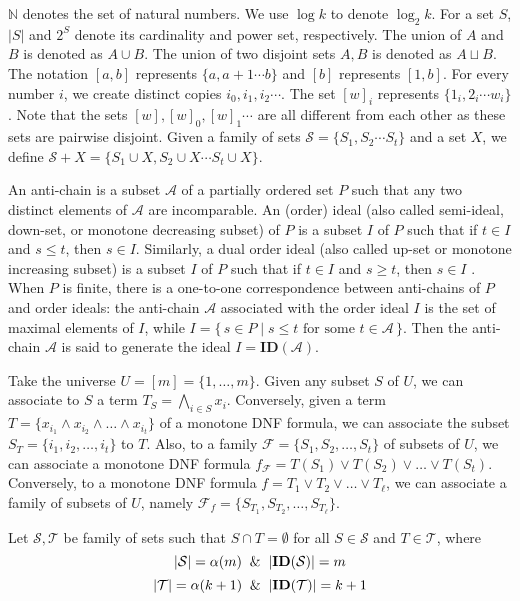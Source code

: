 
$\mathbb{N}$ denotes the set of natural numbers. We use
$\log{k}$ to denote $\log_{2}{k}$. For a set $S$, $|{S}|$
and $2^{{S}}$ denote its cardinality and power set,
respectively. The union of $A$ and $B$ is denoted as $A\cup B$. The union of two disjoint sets $A,B$ is denoted as $A \sqcup B$. The notation $[a,b]$ represents
$\{a,a+1\cdots b\}$ and $[b]$ represents $[1,b]$.
For every number $i$, we create distinct copies
$i_0,i_1,i_2\cdots$. The set $[w]_i$ represents
$\{1_i,2_i\cdots w_i\}$. Note that the sets
$[w],[w]_0,[w]_1\cdots$ are all different from each
other as these sets are pairwise disjoint. Given a family of
sets $\mathcal{S}=\{S_1,S_2\cdots S_t\}$ and a set $X$, we
define $\mathcal{S}+X= \{S_1\cup X,S_2\cup X\cdots S_t\cup X\}$.

An anti-chain is a subset $\mathcal{A}$ of a partially
ordered set $P$ such that any two distinct elements of
$\mathcal{A}$ are incomparable. An (order) ideal (also
called semi-ideal, down-set, or monotone decreasing subset)
of $P$ is a subset $I$ of $P$ such that if $t \in I$ and
$s \leq t$, then $s \in I$. Similarly, a dual order ideal
(also called up-set or monotone increasing subset) is a
subset $I$ of $P$ such that if $t \in I$ and $s \geq t$,
then $s \in I$ \cite{stanley}. When $P$ is finite, there is
a one-to-one correspondence between anti-chains of $P$ and
order ideals: the anti-chain $\mathcal{A}$ associated with
the order ideal $I$ is the set of maximal elements of $I$,
while $I = \{\, s \in P \mid s \leq t \text{ for some }
t \in \mathcal{A} \,\}$. Then the anti-chain $\mathcal{A}$
is said to generate the ideal $I=\mathbf{ID}(\mathcal{A})$.


Take the universe $U = [m] = \{1,\ldots,m\}$. Given any subset
$S$ of $U$, we can associate to $S$ a term
$T_S= \bigwedge_{i \in S} x_i$. Conversely, given a term
$T= \{ x_{i_1} \land x_{i_2} \land \ldots \land x_{i_t} \}$
of a monotone DNF formula, we can associate the subset
$S_T = \{i_1, i_2, \ldots, i_t\}$ to $T$. Also, to a family
$\mathcal{F} = \{ S_1, S_2, \ldots, S_t\}$ of subsets of $U$,
we can associate a monotone DNF formula
$f_{\mathcal{F}} = T(S_1) \lor T(S_2) \lor \ldots \lor T(S_t)$.
Conversely, to a monotone DNF formula
$f = T_1 \lor T_2 \lor \ldots \lor T_{\ell}$, we can associate
a family of subsets of $U$, namely
$\mathcal{F}_f = \{S_{T_1}, S_{T_2}, \ldots, S_{T_\ell} \}$.


Let $\mathcal{S},\mathcal{T}$ be family of sets such that $S\cap
T=\emptyset$ for all $S\in \mathcal{S}$ and $T\in \mathcal{T}$, where
  $$|\mathcal{S}|=\alpha(m) \And |\mathbf{ID}(\mathcal{S})|=m$$
  $$|\mathcal{T}|=\alpha(k+1) \And |\mathbf{ID}(\mathcal{T})|=k+1$$

